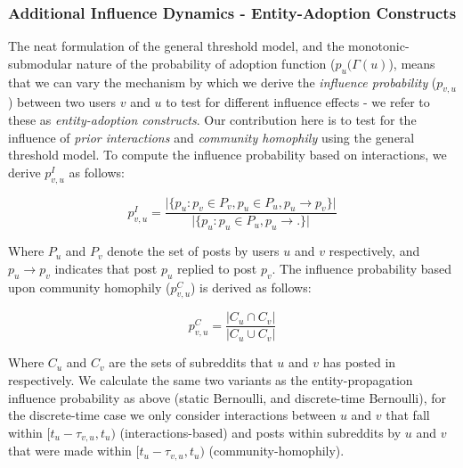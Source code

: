 \documentclass[10pt,journal,compsoc]{IEEEtran}
\begin{document}
\subsubsection{Additional Influence Dynamics - Entity-Adoption Constructs}
The neat formulation of the general threshold model, and the monotonic-submodular nature of the probability of adoption function ($p_u(\Gamma(u)$), means that we can vary the mechanism by which we derive the \emph{influence probability} ($p_{v,u}$) between two users $v$ and $u$ to test for different influence effects - we refer to these as \emph{entity-adoption constructs}.
Our contribution here is to test for the influence of \emph{prior interactions} and \emph{community homophily} using the general threshold model.
To compute the influence probability based on interactions, we derive $p^I_{v,u}$ as follows:

\begin{equation}
p^{I}_{v,u} = \frac{\vert \{ p_u : p_v \in P_v, p_u \in P_u, p_u \rightarrow p_v \} \vert}{\vert \{ p_u : p_u \in P_u, p_u \rightarrow . \} \vert}
\end{equation}

Where $P_u$ and $P_v$ denote the set of posts by users $u$ and $v$ respectively, and $p_u \rightarrow p_v$ indicates that post $p_u$ replied to post $p_v$.
The influence probability based upon community homophily ($p_{v,u}^C$) is derived as follows:

\begin{equation}
p^C_{v,u} = \frac{\vert C_u \cap C_v \vert}{\vert C_u \cup C_v \vert}
\end{equation}

Where $C_u$ and $C_v$ are the sets of subreddits that $u$ and $v$ has posted in respectively.
We calculate the same two variants as the entity-propagation influence probability as above (static Bernoulli, and discrete-time Bernoulli), for the discrete-time case we only consider interactions between $u$ and $v$ that fall within $[t_u - \tau_{v,u}, t_u)$ (interactions-based) and posts within subreddits by $u$ and $v$ that were made within $[t_u - \tau_{v,u}, t_u)$ (community-homophily).
\end{document}

